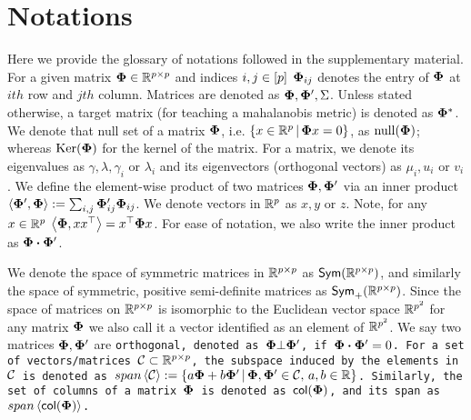 \section{Notations}\label{app: notations}
Here we provide the glossary of notations followed in the supplementary material.
\iffalse
For a given matrix $\boldsymbol{\Phi} \in \mathbb{R}^{p\times p}$ and indices $i,j \in \left[p\right]$ $\boldsymbol{\Phi}_{ij}$ denotes the entry of $\boldsymbol{\Phi}$ at $ith$ row and $jth$ column. Matrices are denoted as $\boldsymbol{\Phi},\boldsymbol{\Phi}',\Sigma$. Unless stated otherwise, a target matrix (for teaching a mahalanobis metric) is denoted as $\boldsymbol{\Phi}^*$. We denote that null set of a matrix $\boldsymbol{\Phi}$, i.e. $\left\{x \in \mathbb{R}^p\,|\, \boldsymbol{\Phi} x = 0\right\}$, as $\mathrm{null}({\boldsymbol{\Phi}})$; whereas $
\mathrm{Ker}({\boldsymbol{\Phi}})$ for the kernel of the matrix. For a matrix, we denote its eigenvalues as $\gamma,\lambda, \gamma_i$ or $\lambda_i$ and its eigenvectors (orthogonal vectors) as $\mu_i ,u_i$ or $v_i$. We define the element-wise product of two matrices $\boldsymbol{\Phi},\boldsymbol{\Phi}'$ via an inner product $\left<\boldsymbol{\Phi}', \boldsymbol{\Phi}\right> := \sum_{i,j} \boldsymbol{\Phi}'_{ij}\boldsymbol{\Phi}_{ij}$. 
We denote vectors in $\mathbb{R}^p$ as $x,y$ or $z$.
Note, for any $x \in \mathbb{R}^p$ $\left<\boldsymbol{\Phi}, xx^{\top}\right> = x^{\top}\boldsymbol{\Phi} x$. For ease of notation, we also write the inner product as $\boldsymbol{\Phi} \boldsymbol{\cdot} \boldsymbol{\Phi}'$.

We denote the space of symmetric matrices in $\mathbb{R}^{p \times p}$ as $\textsf{Sym}(\mathbb{R}^{p\times p})$, and similarly the space of symmetric, positive semi-definite matrices as $\textsf{Sym}_{+}(\mathbb{R}^{p\times p})$.
Since the space of matrices on $\mathbb{R}^{p\times p}$ is isomorphic to the Euclidean vector space $\mathbb{R}^{p^2}$ for any matrix $\boldsymbol{\Phi}$ we also call it a vector identified as an element of $\mathbb{R}^{p^2}$. We say two matrices $\boldsymbol{\Phi},\boldsymbol{\Phi}'$ are \tt{orthogonal}, denoted as $\boldsymbol{\Phi} \bot \boldsymbol{\Phi}'$, if $\boldsymbol{\Phi} \boldsymbol{\cdot} \boldsymbol{\Phi}' = 0$. For a set of vectors/matrices ${\mathcal{C}} \subset \mathbb{R}^{p\times p}$, the subspace induced by the elements in ${\mathcal{C}}$ is denoted as $span \left<{\mathcal{C}}\right> := \left\{a \boldsymbol{\Phi} + b \boldsymbol{\Phi}' \,|\, \boldsymbol{\Phi},\boldsymbol{\Phi}' \in {\mathcal{C}},\, a,b \in \mathbb{R}\right\}$. Similarly, the set of columns of a matrix $\boldsymbol{\Phi}$ is denoted as $\textsf{col}({\boldsymbol{\Phi}})$, and its span as $span \left<\textsf{col}({\boldsymbol{\Phi}})\right>$.

